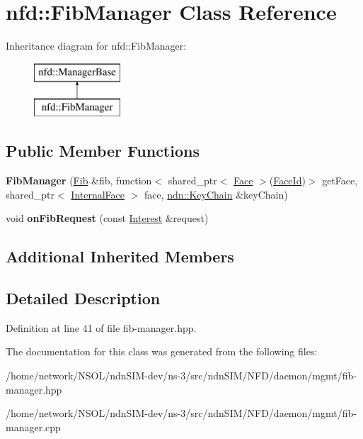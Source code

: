 \hypertarget{classnfd_1_1FibManager}{}\section{nfd\+:\+:Fib\+Manager Class Reference}
\label{classnfd_1_1FibManager}
Inheritance diagram for nfd\+:\+:Fib\+Manager\+:\begin{figure}[H]
\begin{center}
\leavevmode
\includegraphics[height=2.000000cm]{classnfd_1_1FibManager}
\end{center}
\end{figure}
\subsection*{Public Member Functions}
\begin{DoxyCompactItemize}
\item 
{\bfseries Fib\+Manager} (\hyperlink{classnfd_1_1Fib}{Fib} \&fib, function$<$ shared\+\_\+ptr$<$ \hyperlink{classnfd_1_1Face}{Face} $>$(\hyperlink{classFaceId}{Face\+Id})$>$ get\+Face, shared\+\_\+ptr$<$ \hyperlink{classnfd_1_1InternalFace}{Internal\+Face} $>$ face, \hyperlink{classndn_1_1security_1_1KeyChain}{ndn\+::\+Key\+Chain} \&key\+Chain)\hypertarget{classnfd_1_1FibManager_a29e278cbc15eec8bc9648a5a2aa8d0c7}{}\label{classnfd_1_1FibManager_a29e278cbc15eec8bc9648a5a2aa8d0c7}

\item 
void {\bfseries on\+Fib\+Request} (const \hyperlink{classndn_1_1Interest}{Interest} \&request)\hypertarget{classnfd_1_1FibManager_a8e1700f9809be897e30ea95e92edc5a7}{}\label{classnfd_1_1FibManager_a8e1700f9809be897e30ea95e92edc5a7}

\end{DoxyCompactItemize}
\subsection*{Additional Inherited Members}


\subsection{Detailed Description}


Definition at line 41 of file fib-\/manager.\+hpp.



The documentation for this class was generated from the following files\+:\begin{DoxyCompactItemize}
\item 
/home/network/\+N\+S\+O\+L/ndn\+S\+I\+M-\/dev/ns-\/3/src/ndn\+S\+I\+M/\+N\+F\+D/daemon/mgmt/fib-\/manager.\+hpp\item 
/home/network/\+N\+S\+O\+L/ndn\+S\+I\+M-\/dev/ns-\/3/src/ndn\+S\+I\+M/\+N\+F\+D/daemon/mgmt/fib-\/manager.\+cpp\end{DoxyCompactItemize}

